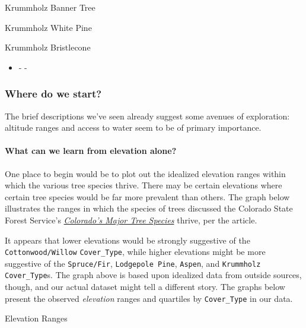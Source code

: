 \documentclass[11pt]{article}
\providecommand{\tightlist}{%
      \setlength{\itemsep}{0pt}\setlength{\parskip}{0pt}}
\begin{document}
Krummholz Banner Tree

\textbar{}

Krummholz White Pine

\textbar{}

Krummholz Bristlecone

\begin{itemize}
\tightlist
\item
  \textbar{}- \textbar{}- \textbar{} \textbar{} \textbar{} \textbar{}
\end{itemize}

    \subsubsection{Where do we start?}\label{where-do-we-start}

The brief descriptions we've seen already suggest some avenues of
exploration: altitude ranges and access to water seem to be of primary
importance.

\paragraph{What can we learn from elevation
alone?}\label{what-can-we-learn-from-elevation-alone}

One place to begin would be to plot out the idealized elevation ranges
within which the various tree species thrive. There may be certain
elevations where certain tree species would be far more prevalent than
others. The graph below illustrates the ranges in which the species of
trees discussed the Colorado State Forest Service's
\href{https://csfs.colostate.edu/colorado-trees/colorados-major-tree-species/}{\emph{Colorado's
Major Tree Species}} thrive, per the article.

    

    It appears that lower elevations would be strongly suggestive of the
\texttt{Cottonwood/Willow} \texttt{Cover\_Type}, while higher elevations
might be more suggestive of the \texttt{Spruce/Fir},
\texttt{Lodgepole\ Pine}, \texttt{Aspen}, and \texttt{Krummholz}
\texttt{Cover\_Type}s. The graph above is based upon idealized data from
outside sources, though, and our actual dataset might tell a different
story. The graphs below present the observed \emph{elevation} ranges and
quartiles by \texttt{Cover\_Type} in our data.

\textbar{}

Elevation Ranges

\textbar{}
\end{document}
